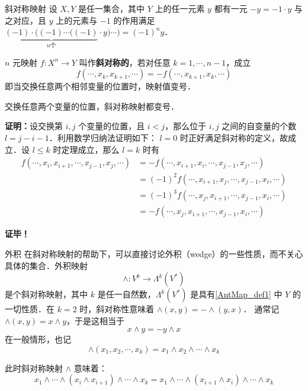 

\begin{definition}{斜对称映射}\label{AntMap_def1}
设 $X,Y$ 是任一集合，其中 $Y$ 上的任一元素 $y$ 都有一元 $-y=-1\cdot y$ 与之对应，且 $y$ 上的元素与 $-1$ 的作用满足 $\underbrace{(-1)\cdot((-1)\cdots((-1)}_{n\text{个}}\cdot y)\cdots)=(-1)^n y$．

 $n$ 元映射 $f:X^n\rightarrow Y$ 叫作\textbf{斜对称的}，若对任意 $k=1,\cdots,n-1$，成立
\begin{equation}
f(\cdots,x_k,x_{k+1},\cdots)=-f(\cdots,x_{k+1},x_k,\cdots)
\end{equation}
即当交换任意两个相邻变量的位置时，映射值变号．
\end{definition}
\begin{theorem}{}
交换任意两个变量的位置，斜对称映射都变号．
\end{theorem}
\textbf{证明：}设交换第 $i,j$ 个变量的位置，且 $i<j$，那么位于 $i,j$ 之间的自变量的个数 $l=j-i-1$．利用数学归纳法证明如下： $l=0$ 时正好满足斜对称的定义，故成立．设 $l\leq k$ 时定理成立，那么 $l=k$ 时有
\begin{equation}
\begin{aligned}
f(\cdots,x_i,x_{i+1},\cdots,x_{j-1},x_j,\cdots)&=-f(\cdots,x_{i+1},x_{i},\cdots,x_{j-1},x_j,\cdots)\\
&=(-1)^2 f(\cdots,x_{i+1},x_{j},\cdots,x_{j-1},x_i,\cdots)\\
&=(-1)^3 f(\cdots,x_{j},x_{i+1},\cdots,x_{j-1},x_i,\cdots)\\
&=-f(\cdots,x_{j},x_{i+1},\cdots,x_{j-1},x_i,\cdots)
\end{aligned}
\end{equation}
  
\textbf{证毕！}
\begin{example}{外积}
在斜对称映射的帮助下，可以直接讨论外积（wedge）的一些性质，而不关心具体的集合．外积映射
\begin{equation}
\wedge:V^k\rightarrow \Lambda^k(V^*)
\end{equation}
是个斜对称映射，其中 $k$ 是任一自然数，$\Lambda^k(V^*)$ 是具有\autoref{AntMap_def1} 中 $Y$ 的一切性质．在 $k=2$ 时，斜对称性意味着 $\wedge(x,y)=-\wedge(y,x)$． 通常记 $\wedge(x,y)=x\wedge y$，于是这相当于
\begin{equation}
x\wedge y=-y\wedge x
\end{equation}
在一般情形，也记 
\begin{equation}
\wedge(x_1,x_2,\cdots,x_k)=x_1\wedge x_2\wedge\cdots\wedge x_k
\end{equation}
\end{example}
此时斜对称映射 $\wedge$ 意味着：
\begin{equation}
x_1\wedge\cdots\wedge (x_i\wedge x_{i+1})\wedge\cdots\wedge x_k=x_1\wedge\cdots\wedge (x_{i+1}\wedge x_{i})\wedge\cdots\wedge x_k
\end{equation}

